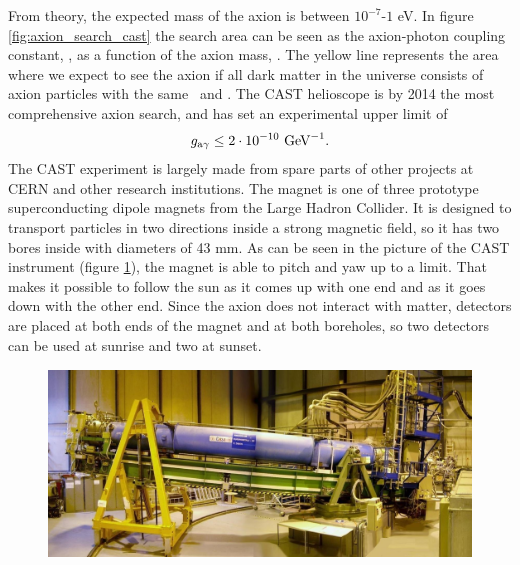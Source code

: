 From theory, the expected mass of the axion is between $10^{-7}$-$1$ eV. In figure \ref{fig:axion_search_cast} the search area can be seen as the axion-photon coupling constant, \gay, as a function of the axion mass, \maxion. The yellow line represents the area where we expect to see the axion if all dark matter in the universe consists of axion particles with the same \maxion\ and \gay. The CAST helioscope is by 2014 the most comprehensive axion search, and has set an experimental upper limit of
\begin{eqnarray}
g_{\textrm{a$\gamma$}} \leq 2 \cdot 10^{-10} \textrm{ GeV}^{-1}.
\end{eqnarray}
The CAST experiment is largely made from spare parts of other projects at CERN and other research institutions. The magnet is one of three prototype superconducting dipole magnets from the Large Hadron Collider. It is designed to transport particles in two directions inside a strong magnetic field, so it has two bores inside with diameters of 43 mm. As can be seen in the picture of the CAST instrument (figure \ref{fig:cast_instrument}), the magnet is able to pitch and yaw up to a limit. That makes it possible to follow the sun as it comes up with one end and as it goes down with the other end. Since the axion does not interact with matter, detectors are placed at both ends of the magnet and at both boreholes, so two detectors can be used at sunrise and two at sunset.

\begin{figure}[htbp]
  \centering
    \includegraphics[height=5cm]{figures/cast/cast_instrument.jpg}
  \caption{}
  \label{fig:cast_instrument}
\end{figure}

